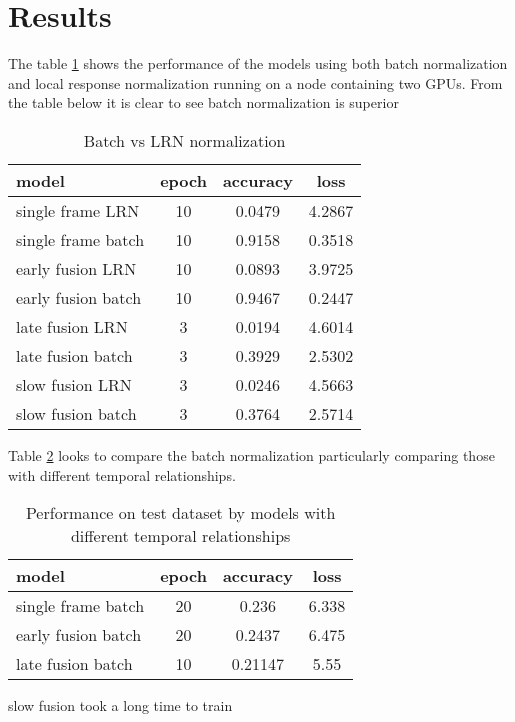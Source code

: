 
    \section{Results}
     The table \ref{lrnvsbatch} shows the performance of the models using both batch normalization and local response normalization running on a node containing two GPUs. From the table below it is clear to see batch normalization is superior
\begin{table}[h!]
\begin{center}
\begin{tabular}{ |l|c|c|c| } 
 \hline
 model & epoch & accuracy & loss \\ 
  \hline
 single frame LRN & 10 & 0.0479 & 4.2867 \\ 
 single frame batch  & 10 & 0.9158 & 0.3518 \\ 
 early fusion LRN & 10 & 0.0893 & 3.9725 \\
 early fusion batch & 10 & 0.9467 &  0.2447  \\
 late fusion LRN & 3 & 0.0194 &  4.6014  \\
 late fusion batch & 3 & 0.3929  & 2.5302 \\
 slow fusion LRN & 3 & 0.0246 & 4.5663  \\
 slow fusion batch & 3 & 0.3764  & 2.5714  \\
 \hline
\end{tabular}
\caption{Batch vs LRN normalization}
\label{lrnvsbatch}
\end{center}
\end{table}

Table \ref{fusions} looks to compare the batch normalization particularly comparing those with different temporal relationships.

\begin{table}[h!]
\begin{center}
\begin{tabular}{ |l|c|c|c| } 
 \hline
 model & epoch &accuracy & loss \\ 
  \hline
 single frame batch  & 20   & 0.236 & 6.338 \\ 
 early fusion batch  & 20 & 0.2437 &  6.475  \\
 late fusion batch   & 10 & 0.21147 & 5.55 \\
 \hline
\end{tabular}
\caption{ Performance on test dataset by models with different temporal relationships}
\label{fusions}
\end{center}
\end{table}
slow fusion took a long time to train 

